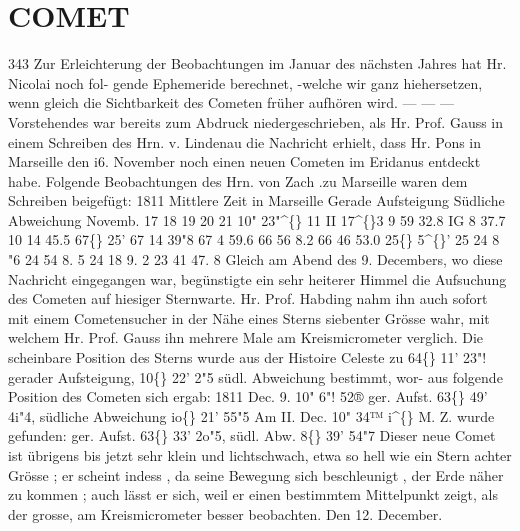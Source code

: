 \documentclass[12pt,a4paper]{article}
\newcommand{\degree}{\textdegree}
\begin{document}
\section*{COMET}
343 
Zur  Erleichterung  der  Beobachtungen  im  Januar  des  nächsten  Jahres  hat  Hr.  Nicolai  noch  fol- 
gende Ephemeride  berechnet,  -welche  wir  ganz  hiehersetzen,  wenn  gleich  die  Sichtbarkeit  des  Cometen 
früher  aufhören  wird.     ---     ---     --- 
Vorstehendes  war  bereits  zum  Abdruck  niedergeschrieben,  als  Hr.  Prof.  Gauss  in  einem  Schreiben 
des  Hrn.  v.  Lindenau  die  Nachricht  erhielt,  dass  Hr.  Pons  in  Marseille  den  i6.  November  noch  einen 
neuen  Cometen  im  Eridanus  entdeckt  habe.  Folgende  Beobachtungen  des  Hrn.  von  Zach  .zu  Marseille 
waren  dem  Schreiben  beigefügt: 
1811 
Mittlere  Zeit 
in  Marseille 
Gerade 
Aufsteigung 
Südliche 
Abweichung 
Novemb.  17 
18 
19 
20 
21 
10"  23"\textasciicircum\{\} 
11     II     17\textasciicircum\{\}3 
9     59     32.8 
IG       8     37.7 
10     14     45.5 
67\degree\{\}  25' 
67     14     39"8 
67       4     59.6 
66     56       8.2 
66     46     53.0 
25\degree\{\}  5\textasciicircum\{\}' 
25     24       8  "6 
24     54       8. 5 
24     18       9. 2 
23     41     47. 8 
Gleich  am  Abend  des  9.  Decembers,  wo  diese  Nachricht  eingegangen  war,  begünstigte  ein  sehr 
heiterer  Himmel  die  Aufsuchung  des  Cometen  auf  hiesiger  Sternwarte.  Hr.  Prof.  Habding  nahm  ihn 
auch  sofort  mit  einem  Cometensucher  in  der  Nähe  eines  Sterns  siebenter  Grösse  wahr,  mit  welchem  Hr. 
Prof.  Gauss  ihn  mehrere  Male  am  Kreismicrometer  verglich.  Die  scheinbare  Position  des  Sterns  wurde 
aus  der  Histoire  Celeste  zu  64\degree\{\}  11'  23"!  gerader  Aufsteigung,  10\degree\{\}  22'  2"5  südl.  Abweichung  bestimmt,  wor- 
aus folgende  Position  des  Cometen  sich  ergab: 
1811  Dec.  9.  10"  6"!  52®  ger.  Aufst.  63\degree\{\}  49'  4i"4,   südliche  Abweichung  io\degree\{\}  21'  55"5 
Am  II.  Dec.  10"  34™  i\textasciicircum\{\}  M.  Z.  wurde  gefunden:  ger.  Aufst.  63\degree\{\}  33'  2o"5,  südl.  Abw.  8\degree\{\}  39'  54"7 
Dieser  neue  Comet  ist  übrigens  bis  jetzt  sehr  klein  und  lichtschwach,  etwa  so  hell  wie  ein  Stern 
achter  Grösse ;  er  scheint  indess ,  da  seine  Bewegung  sich  beschleunigt ,  der  Erde  näher  zu  kommen ; 
auch  lässt  er  sich,  weil  er  einen  bestimmtem  Mittelpunkt  zeigt,  als  der  grosse,  am  Kreismicrometer 
besser  beobachten. 
Den  12.  December. 
\end{document}

